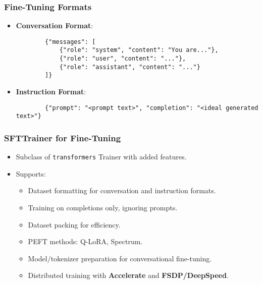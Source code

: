 \begin{frame}[fragile]\frametitle{Fine-Tuning Formats}
    \begin{itemize}
        \item \textbf{Conversation Format}:
        \begin{verbatim}
        {"messages": [
            {"role": "system", "content": "You are..."},
            {"role": "user", "content": "..."},
            {"role": "assistant", "content": "..."}
        ]}
        \end{verbatim}
        \item \textbf{Instruction Format}:
        \begin{verbatim}
        {"prompt": "<prompt text>", "completion": "<ideal generated text>"}
        \end{verbatim}
    \end{itemize}
\end{frame}

\begin{frame}[fragile]\frametitle{SFTTrainer for Fine-Tuning}
    \begin{itemize}
        \item Subclass of \texttt{transformers} Trainer with added features.
        \item Supports:
        \begin{itemize}
            \item Dataset formatting for conversation and instruction formats.
            \item Training on completions only, ignoring prompts.
            \item Dataset packing for efficiency.
            \item PEFT methods: Q-LoRA, Spectrum.
            \item Model/tokenizer preparation for conversational fine-tuning.
            \item Distributed training with \textbf{Accelerate} and \textbf{FSDP/DeepSpeed}.
        \end{itemize}
    \end{itemize}
\end{frame}




